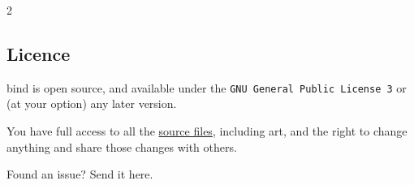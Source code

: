 \begin{multicols}{2}
\subsection*{Licence}

\Gls{bind} is open source, and available under the {\tt GNU General Public License 3} or (at your option) any later version.

You have full access to all the \href{https://gitlab.com/bindrpg/core}{source files}, including art, and the right to change anything and share those changes with others.

\begin{center}
  
  Found an issue?
  Send it here.
\end{center}

\end{multicols}
